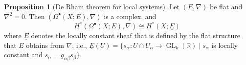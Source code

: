 \documentclass[10pt,letterpaper,cm]{nupset}
\theoremstyle{definition}
\theoremstyle{theorem}
\newtheorem{prop}[definition]{Proposition}
\theoremstyle{remark}
\newcommand{\R}{\mathbb{R}}
\newcommand{\1}{\mathbb{1}}
\newcommand{\0}{\vec 0}
\DeclareMathOperator{\GL}{GL}
\begin{document}
\begin{prop}[De Rham theorem for local systems]
Let $(E, \nabla)$ be flat and $\nabla^2 =0$. Then $(\Omega^{\bullet}(X; E), \nabla)$ is a complex, and $$H^{\ast}(\Omega^{\bullet}(X; E), \nabla) \cong H^{\ast}(X; \underline{E})$$ where $\underline{E}$ denotes the locally constant sheaf that is defined by the flat structure that $E$ obtains  from $\nabla$, i.e., $\underline{E}(U) = \{s_{\alpha} : U \cap U_{\alpha} \to \GL_k(\R) \mid s_{\alpha}$ is locally constant and $s_{\alpha} = g_{\alpha{\beta}}s_{\beta}\}$.
\end{prop}
\end{document}

